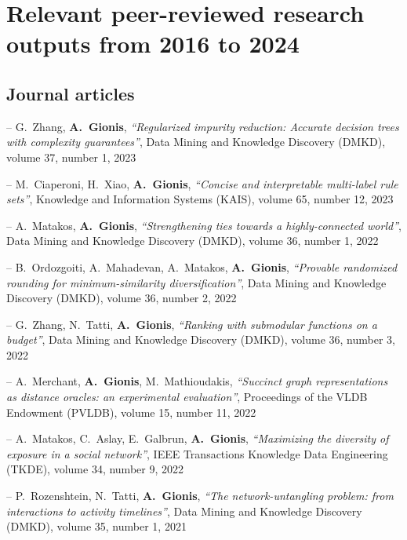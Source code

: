 \documentclass[a4paper,11pt]{article}
\begin{document}
\section{Relevant peer-reviewed research outputs from 2016 to 2024}

\subsection{Journal articles}

\biblist

\item[--] 
{G.\ Zhang, \textbf{A.\ Gionis}},
{\em ``Regularized impurity reduction: Accurate decision trees with complexity guarantees''},
Data Mining and Knowledge Discovery (DMKD), 
volume 37, number 1, 2023

\item[--] 
{ M.\ Ciaperoni, H.\ Xiao, \textbf{A.\ Gionis}},
{\em ``Concise and interpretable multi-label rule sets''}, 
Knowledge and Information Systems (KAIS),
volume 65, number 12, 2023

\item[--] 
{A.\ Matakos, \textbf{A.\ Gionis}},
{\em ``Strengthening ties towards a highly-connected world''},
Data Mining and Knowledge Discovery (DMKD),
volume 36, number 1, 2022

\item[--] 
{B.\ Ordozgoiti, A.\ Mahadevan, A.\ Matakos, \textbf{A.\ Gionis}},
{\em ``Provable randomized rounding for minimum-similarity diversification''},
Data Mining and Knowledge Discovery (DMKD),
volume 36, number 2, 2022

\item[--] 
{G.\ Zhang, N.\ Tatti, \textbf{A.\ Gionis}},
{\em ``Ranking with submodular functions on a budget''},
Data Mining and Knowledge Discovery (DMKD),
volume 36, number 3, 2022

\item[--] 
{A.\ Merchant, \textbf{A.\ Gionis}, M.\ Mathioudakis},
{\em ``Succinct graph representations as distance oracles: an experimental evaluation''},
Proceedings of the VLDB Endowment (PVLDB),
volume 15, number 11, 2022

\item[--] 
{A.\ Matakos, C.\ Aslay, E.\ Galbrun, \textbf{A.\ Gionis}},
{\em ``Maximizing the diversity of exposure in a social network''},
IEEE Transactions Knowledge Data Engineering (TKDE),
volume 34, number 9, 2022

\item[--] 
{P.\ Rozenshtein, N.\ Tatti, \textbf{A.\ Gionis}},
{\em ``The network-untangling problem: from interactions to activity timelines''},
Data Mining and Knowledge Discovery (DMKD),
volume 35, number 1, 2021
\end{document}
